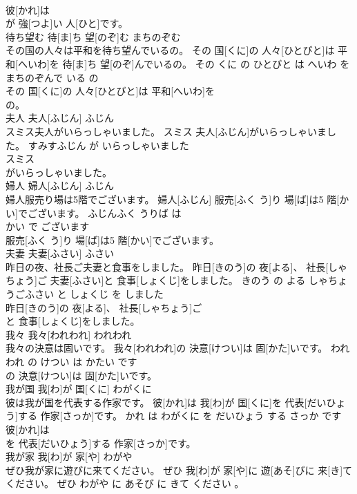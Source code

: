 \documentclass[8pt]{extreport}
\begin{document}
\begin{CJK}{UTF8}{min}
\\	彼[かれ]は
\\	が 強[つよ]い 人[ひと]です。			
\\	待ち望む	待[ま]ち 望[のぞ]む	まちのぞむ	
\\	その国の人々は平和を待ち望んでいるの。	その 国[くに]の 人々[ひとびと]は 平和[へいわ]を 待[ま]ち 望[のぞ]んでいるの。	その くに の ひとびと は へいわ を まちのぞんで いる の	
\\	その 国[くに]の 人々[ひとびと]は 平和[へいわ]を
\\	の。			
\\	夫人	夫人[ふじん]	ふじん	
\\	スミス夫人がいらっしゃいました。	スミス 夫人[ふじん]がいらっしゃいました。	すみすふじん が いらっしゃいました	
\\	スミス
\\	がいらっしゃいました。			
\\	婦人	婦人[ふじん]	ふじん	
\\	婦人服売り場は5階でございます。	婦人[ふじん] 服売[ふく う]り 場[ば]は5 階[かい]でございます。	ふじんふく うりば は 
\\	かい で ございます	
\\	服売[ふく う]り 場[ば]は5 階[かい]でございます。			
\\	夫妻	夫妻[ふさい]	ふさい	
\\	昨日の夜、社長ご夫妻と食事をしました。	昨日[きのう]の 夜[よる]、 社長[しゃちょう]ご 夫妻[ふさい]と 食事[しょくじ]をしました。	きのう の よる しゃちょうごふさい と しょくじ を しました	
\\	昨日[きのう]の 夜[よる]、 社長[しゃちょう]ご
\\	と 食事[しょくじ]をしました。			
\\	我々	我々[われわれ]	われわれ	
\\	我々の決意は固いです。	我々[われわれ]の 決意[けつい]は 固[かた]いです。	われわれ の けつい は かたい です	
\\	の 決意[けつい]は 固[かた]いです。			
\\	我が国	我[わ]が 国[くに]	わがくに	
\\	彼は我が国を代表する作家です。	彼[かれ]は 我[わ]が 国[くに]を 代表[だいひょう]する 作家[さっか]です。	かれ は わがくに を だいひょう する さっか です	
\\	彼[かれ]は
\\	を 代表[だいひょう]する 作家[さっか]です。			
\\	我が家	我[わ]が 家[や]	わがや	
\\	ぜひ我が家に遊びに来てください。	ぜひ 我[わ]が 家[や]に 遊[あそ]びに 来[き]てください。	ぜひ わがや に あそび に きて ください 。	

\end{CJK}
\end{document}

